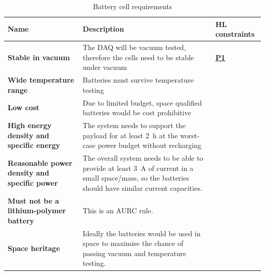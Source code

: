 \documentclass{report}
\newcommand{\hlreq}[1]{\hyperlink{req-#1}{\textbf{#1}}}
\begin{document}
\begin{table}[H]
  \centering
  \begin{tabular}{|L{0.2\textwidth}|L{0.495\textwidth}|L{0.2\textwidth}|}
    \hline
    \textbf{Name}                                        & \textbf{Description}                                                                                                                                               & \textbf{HL constraints} \\ \hline
    \textbf{Stable in vacuum}                            & The DAQ will be vacuum tested, therefore the cells need to be stable under vacuum                                                                                  & \hlreq{P1}              \\\hline
    \textbf{Wide temperature range}                      & Batteries must survive temperature testing                                                                                                                         &                         \\\hline
    \textbf{Low cost}                                    & Due to limited budget, space qualified batteries would be cost prohibitive                                                                                         &                         \\\hline
    \textbf{High energy density and specific energy}     & The system needs to support the payload for at least \SI{2}{\hour} at the worst-case power budget without recharging                                               &                         \\\hline
    \textbf{Reasonable power density and specific power} & The overall system needs to be able to provide at least \SI{3}{\ampere} of current in a small space/mass, so the batteries should have similar current capacities. &                         \\\hline
    \textbf{Must not be a lithium-polymer battery}       & This is an AURC rule.                                                                                                                                              &                         \\\hline
    \textbf{Space heritage}                              & Ideally the batteries would be used in space to maximise the chance of passing vacuum and temperature testing.                                                     &                         \\\hline
  \end{tabular}
  \caption{Battery cell requirements}
  \label{tabl:battery-requirements}
\end{table}
\end{document}
